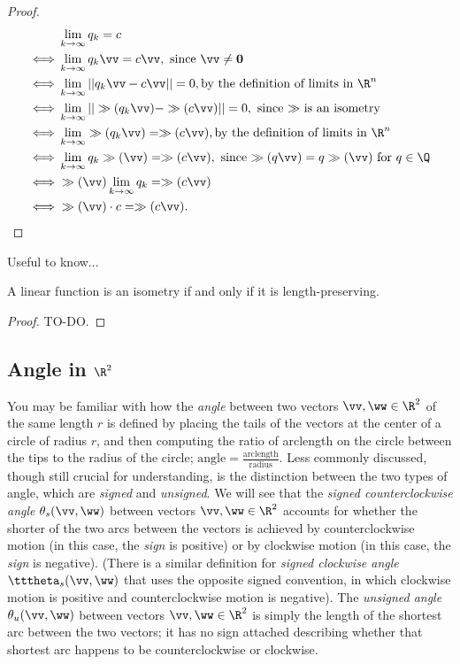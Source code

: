 \begin{proof}
{		\begin{align*}
			&\lim_{k \rightarrow \infty} q_k = c \\
			\iff &\lim_{k \rightarrow \infty} q_k\vv = c\vv, \text{ since $\vv \neq \mathbf{0}$} \\
			\iff &\lim_{k \rightarrow \infty} ||q_k\vv - c\vv|| = 0, \text{by the definition of limits in $\R^n$} \\
			\iff &\lim_{k \rightarrow \infty} ||\gg(q_k\vv) - \gg(c\vv)|| = 0, \text{ since $\gg$ is an isometry} \\
			\iff &\lim_{k \rightarrow \infty} \gg(q_k\vv) = \gg(c\vv), \text{by the definition of limits in $\R^n$} \\
			\iff &\lim_{k \rightarrow \infty} q_k\gg(\vv) = \gg(c\vv), \text{ since $\gg(q\vv) = q\gg(\vv)$ for $q \in \Q$} \\
			\iff &\gg(\vv) \lim_{k \rightarrow \infty} q_k = \gg(c\vv) \\
			\iff &\gg(\vv) \cdot c = \gg(c\vv).
		\end{align*}
	}
\end{proof}

Useful to know...

\begin{theorem}
	A linear function is an isometry if and only if it is length-preserving.
\end{theorem}

\begin{proof}
	TO-DO.
\end{proof}

\subsection*{Angle in $\R^2$}

You may be familiar with how the \textit{angle} between two vectors $\vv, \ww \in \R^2$ of the same length $r$ is defined by placing the tails of the vectors at the center of a circle of radius $r$, and then computing the ratio of arclength on the circle between the tips to the radius of the circle; $\text{angle} = \frac{\text{arclength}}{\text{radius}}$. Less commonly discussed, though still crucial for understanding, is the distinction between the two types of angle, which are \textit{signed} and \textit{unsigned}. We will see that the \textit{signed counterclockwise angle} $\theta_s(\vv, \ww)$ between vectors $\vv, \ww \in \R^2$ accounts for whether the shorter of the two arcs between the vectors is achieved by counterclockwise motion (in this case, the \textit{sign} is positive) or by clockwise motion (in this case, the \textit{sign} is negative). (There is a similar definition for \textit{signed clockwise angle} $\tttheta_s(\vv, \ww)$ that uses the opposite signed convention, in which clockwise motion is positive and counterclockwise motion is negative). The \textit{unsigned angle} $\theta_u(\vv, \ww)$ between vectors $\vv, \ww \in \R^2$ is simply the length of the shortest arc between the two vectors; it has no sign attached describing whether that shortest arc happens to be counterclockwise or clockwise.

